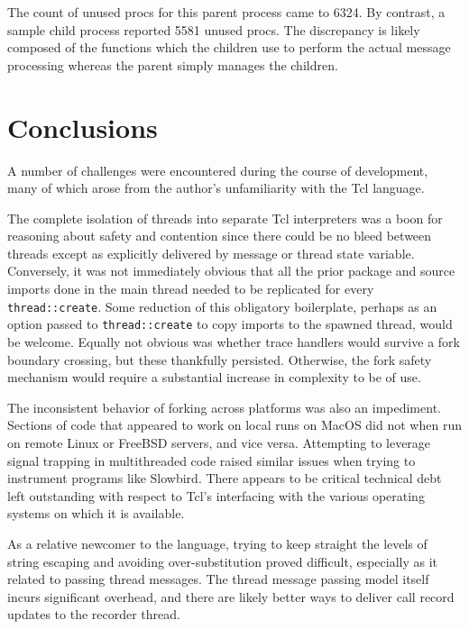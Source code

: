 \documentclass{article}[letter,10pt]
\begin{document}
{{{      The count of unused procs for this parent process came to 6324. By contrast, a sample child process reported 5581 unused procs.
      The discrepancy is likely composed of the functions which the children use to perform the actual message processing whereas
      the parent simply manages the children.
    }
  }
}
\section{Conclusions}{
  A number of challenges were encountered during the course of development, many of which arose from the author's unfamiliarity
  with the Tcl language.

  The complete isolation of threads into separate Tcl interpreters was a boon for reasoning about safety and contention since
  there could be no bleed between threads except as explicitly delivered by message or thread state variable. Conversely,
  it was not immediately obvious that all the prior package and source imports done in the main thread needed to be replicated
  for every \texttt{thread::create}. Some reduction of this obligatory boilerplate, perhaps as an option passed to
  \texttt{thread::create} to copy imports to the spawned thread, would be welcome. Equally not obvious was whether trace
  handlers would survive a fork boundary crossing, but these thankfully persisted. Otherwise, the fork safety mechanism would
  require a substantial increase in complexity to be of use.

  The inconsistent behavior of forking across platforms was also an impediment. Sections of code that appeared to work on local
  runs on MacOS did not when run on remote Linux or FreeBSD servers, and vice versa. Attempting to leverage signal trapping
  in multithreaded code raised similar issues\autocite{bounty32} when trying to instrument programs like Slowbird.
  There appears to be critical technical debt left outstanding with respect to Tcl's interfacing with the various operating systems
  on which it is available.

  As a relative newcomer to the language, trying to keep straight the levels of string escaping and avoiding over-substitution
  proved difficult, especially as it related to passing thread messages. The thread message passing model itself incurs significant
  overhead, and there are likely better ways to deliver call record updates to the recorder thread.

}
\end{document}
